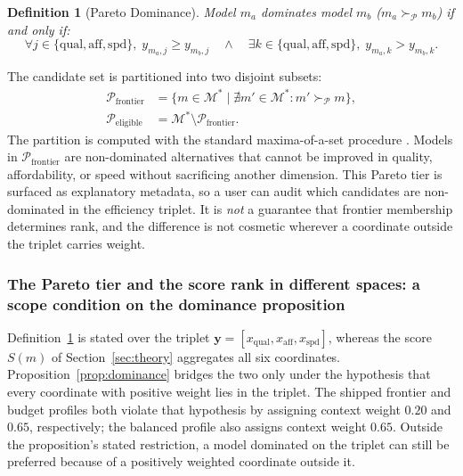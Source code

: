 \documentclass[pdflatex,sn-mathphys-num]{sn-jnl}
\theoremstyle{thmstyleone}
\theoremstyle{thmstylethree}
\newtheorem{definition}{Definition}
\begin{document}
\begin{definition}[Pareto Dominance]\label{def:pareto}
Model $m_a$ dominates model $m_b$ ($m_a \succ_{\mathcal{P}} m_b$) if and only if:
\begin{equation}\label{eq:pareto_def}
\forall j \in \{\text{qual}, \text{aff}, \text{spd}\}, \; y_{m_a, j} \ge y_{m_b, j} \quad \land \quad \exists k \in \{\text{qual}, \text{aff}, \text{spd}\}, \; y_{m_a, k} > y_{m_b, k}.
\end{equation}
\end{definition}

The candidate set is partitioned into two disjoint subsets:
\begin{align}
\mathcal{P}_{\text{frontier}} &= \{ m \in \mathcal{M}^* \mid \nexists m' \in \mathcal{M}^* : m' \succ_{\mathcal{P}} m \}, \label{eq:p_front} \\
\mathcal{P}_{\text{eligible}} &= \mathcal{M}^* \setminus \mathcal{P}_{\text{frontier}}. \label{eq:p_elig}
\end{align}
The partition is computed with the standard maxima-of-a-set procedure \cite{kung1975maxima}. Models in $\mathcal{P}_{\text{frontier}}$ are non-dominated alternatives that cannot be improved in quality, affordability, or speed without sacrificing another dimension. This Pareto tier is surfaced as explanatory metadata, so a user can audit which candidates are non-dominated in the efficiency triplet. It is \emph{not} a guarantee that frontier membership determines rank, and the difference is not cosmetic wherever a coordinate outside the triplet carries weight.

\subsubsection{The Pareto tier and the score rank in different spaces: a scope condition on the dominance proposition}\label{subsec:pareto_scope}

Definition~\ref{def:pareto} is stated over the triplet $\mathbf{y} = [x_{\text{qual}}, x_{\text{aff}}, x_{\text{spd}}]$, whereas the score $S(m)$ of Section~\ref{sec:theory} aggregates all six coordinates. Proposition~\ref{prop:dominance} bridges the two only under the hypothesis that every coordinate with positive weight lies in the triplet. The shipped frontier and budget profiles both violate that hypothesis by assigning context weight $0.20$ and $0.65$, respectively; the balanced profile also assigns context weight $0.65$. Outside the proposition's stated restriction, a model dominated on the triplet can still be preferred because of a positively weighted coordinate outside it.
\end{document}
